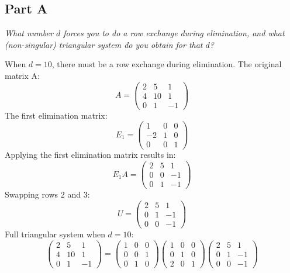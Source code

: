 \documentclass{article}
\begin{document}
\subsection*{Part A}

\textit{What number $ d $ forces you to do a row exchange during elimination,
and what (non-singular) triangular system do you obtain for that $ d $?}

\bigbreak

When $ d = 10 $, there must be a row exchange during elimination. The original
matrix A:
\[
    A = \begin{pmatrix}
        2 & 5 & 1 \\
        4 & 10 & 1 \\
        0 & 1 & -1
    \end{pmatrix}
\]
The first elimination matrix:
\[
    E_1 = \begin{pmatrix}
        1 & 0 & 0 \\
        -2 & 1 & 0 \\
        0 & 0 & 1
    \end{pmatrix}
\]
Applying the first elimination matrix results in:
\[
    E_1 A = \begin{pmatrix}
        2 & 5 & 1 \\
        0 & 0 & -1 \\
        0 & 1 & -1
    \end{pmatrix}
\]
Swapping rows 2 and 3:
\[
    U = \begin{pmatrix}
        2 & 5 & 1 \\
        0 & 1 & -1 \\
        0 & 0 & -1
    \end{pmatrix}
\]
Full triangular system when $ d = 10 $:
\[
    \begin{pmatrix}
        2 & 5 & 1 \\
        4 & 10 & 1 \\
        0 & 1 & -1
    \end{pmatrix}
    =
    \begin{pmatrix}
        1 & 0 & 0 \\
        0 & 0 & 1 \\
        0 & 1 & 0
    \end{pmatrix}
    \begin{pmatrix}
        1 & 0 & 0 \\
        0 & 1 & 0 \\
        2 & 0 & 1
    \end{pmatrix}
    \begin{pmatrix}
        2 & 5 & 1 \\
        0 & 1 & -1 \\
        0 & 0 & -1
    \end{pmatrix}
\]
\end{document}
